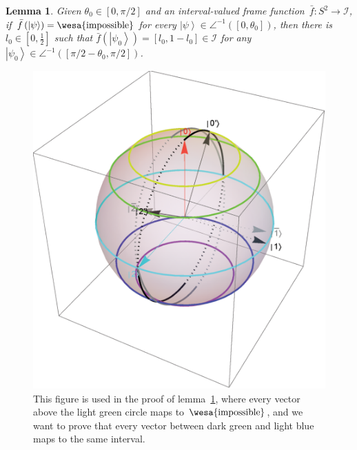 \documentclass[12pt]{iopart}
\theoremstyle{plain}
\newtheorem{lemma}[thm]{Lemma}
\theoremstyle{definition}
\newcommand{\imposs}{{\mbox{\wesa{impossible}}}}
\newcommand{\ket}[1]{{\left\vert{#1}\right\rangle}}
\begin{document}
\begin{lemma}\label{lemma:imposs-imply-same-value}Given
$\theta_{0}\in\left[0,\pi/2\right]$ and an interval-valued frame function~$\bar{f}:S^{2}\rightarrow\mathscr{I}$,
if $\bar{f}\left(\ket{\psi}\right)=\imposs$ for every $\ket{\psi}\in\angle^{-1}\left(\left[0,\theta_{0}\right]\right)$,
then there is $l_{0}\in\left[0,\frac{1}{2}\right]$ such that $\bar{f}\left(\ket{\psi_{0}}\right)=\left[l_{0},1-l_{0}\right]\in\mathscr{I}$
for any $\ket{\psi_{0}}\in\angle^{-1}\left(\left[\pi/2-\theta_{0},\pi/2\right]\right)$.\end{lemma}
\begin{figure}
\begin{centering}
\includegraphics[scale=0.38]{figureb1} 
\par\end{centering}
\caption{\label{fig:three-dimensional-real-frame-1}This figure is used in
the proof of lemma~\ref{lemma:imposs-imply-same-value}, where every
vector above the light green circle maps to $\imposs$, and we want
to prove that every vector between dark green and light blue maps
to the same interval.}
\end{figure}
\end{document}
